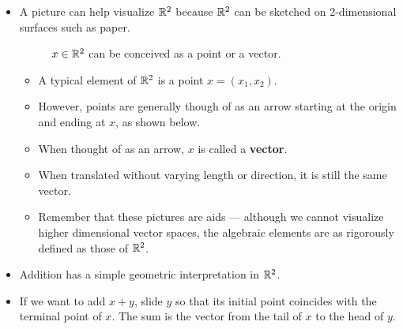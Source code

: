 \documentclass[../main.tex]{subfiles}
\begin{document}
\begin{itemize}
\begin{itemize}
    \end{itemize}
    \item A picture can help visualize $\mathbb{R}^2$ because $\mathbb{R}^2$ can be sketched on 2-dimensional surfaces such as paper.
    \begin{figure}[h!]
        \centering
        \caption{$x\in\mathbb{R}^2$ can be conceived as a point or a vector.}
        \label{fig:axesvector}
    \end{figure}
    \begin{itemize}
        \item A typical element of $\mathbb{R}^2$ is a point $x=(x_1,x_2)$.
        \item However, points are generally though of as an arrow starting at the origin and ending at $x$, as shown below.
        \item When thought of as an arrow, $x$ is called a \textbf{vector}.
        \item When translated without varying length or direction, it is still the same vector.
        \item Remember that these pictures are aids --- although we cannot visualize higher dimensional vector spaces, the algebraic elements are as rigorously defined as those of $\mathbb{R}^2$.
    \end{itemize}
    \item Addition has a simple geometric interpretation in $\mathbb{R}^2$.
    \item If we want to add $x+y$, slide $y$ so that its initial point coincides with the terminal point of $x$. The sum is the vector from the tail of $x$ to the head of $y$.
    \begin{figure}[h!]
        \centering
\end{figure}
\end{itemize}
\end{document}

